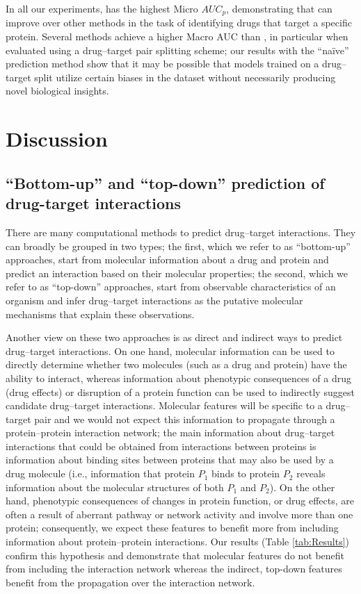 \documentclass{bioinfo}
\begin{document}
In all our experiments, \name{} has the highest Micro $AUC_p$,
demonstrating that \name{} can improve over other methods in the task
of identifying drugs that target a specific protein. Several methods
achieve a higher Macro AUC than \name{}, in particular when evaluated
using a drug--target pair splitting scheme; our results with the
``na\"ive'' prediction method show that it may be possible that models
trained on a drug--target split utilize certain biases in the dataset
without necessarily producing novel biological insights.

\section{Discussion}

\subsection{``Bottom-up'' and ``top-down'' prediction of drug-target interactions}

There are many computational methods to predict drug--target
interactions. They can broadly be grouped in two types; the first,
which we refer to as ``bottom-up'' approaches, start from molecular
information about a drug and protein and predict an interaction based
on their molecular properties; the second, which we refer to as
``top-down'' approaches, start from observable characteristics of an
organism and infer drug--target interactions as the putative molecular
mechanisms that explain these observations.

Another view on these two approaches is as direct and indirect ways to
predict drug--target interactions. On one hand, molecular information can be used
to directly determine whether two molecules (such as a drug and
protein) have the ability to interact, whereas information about
phenotypic consequences of a drug (drug effects) or disruption of a
protein function can be used to indirectly suggest candidate
drug--target interactions. Molecular features will be specific to a
drug--target pair and we would not expect this information to
propagate through a protein--protein interaction network; the main
information about drug--target interactions that could be obtained
from interactions between proteins is information about binding sites
between proteins that may also be used by a drug molecule (i.e.,
information that protein $P_1$ binds to protein $P_2$ reveals
information about the molecular structures of both $P_1$ and
$P_2$). On the other hand, phenotypic consequences of changes in
protein function, or drug effects, are often a result of aberrant
pathway or network activity and involve more than one protein;
consequently, we expect these features to benefit more from including
information about protein--protein interactions. Our results (Table
\ref{tab:Results}) confirm this hypothesis and demonstrate that
molecular features do not benefit from including the interaction
network whereas the indirect, top-down features benefit from the
propagation over the interaction network.
\end{document}
